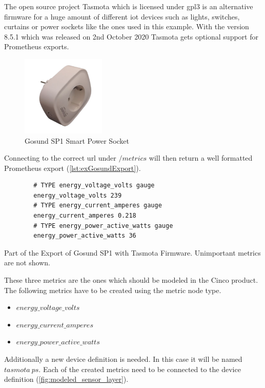 The open source project Tasmota \cite{tasmotawebsite} which is licensed under \gls{gpl3} is an alternative firmware for a huge amount of different \gls{iot} devices such as lights, switches, curtains or power sockets like the ones used in this example.
With the version 8.5.1 which was released on 2nd October 2020 Tasmota gets optional support for Prometheus exports. 

\begin{figure}[!ht]
	\centering
	\includegraphics[width=4cm]{assets/images/gosund.png}
	\caption{Gosund SP1 Smart Power Socket}
	\label{fig:gosund_sp1}
\end{figure}

Connecting to the correct \gls{url} under $/metrics$ will then return a well formatted Prometheus export (\cref{lst:exGosundExport}).

\begin{listing}[!ht]
	\begin{verbatim}
		# TYPE energy_voltage_volts gauge
		energy_voltage_volts 239
		# TYPE energy_current_amperes gauge
		energy_current_amperes 0.218
		# TYPE energy_power_active_watts gauge
		energy_power_active_watts 36
	\end{verbatim}
	\caption{Part of the Export of Gosund SP1 with Tasmota Firmware. Unimportant metrics are not shown.}
	\label{lst:exGosundExport}
\end{listing}

These three metrics are the ones which should be modeled in the Cinco product. The following metrics have to be created using the metric node type. 

\begin{itemize}
	\item $energy\_voltage\_volts$
	\item $energy\_current\_amperes$
	\item $energy\_power\_active\_watts$ 
\end{itemize}

Additionally a new device definition is needed. In this case it will be named $tasmota\ ps$. Each of the created metrics need to be connected to the device definition (\cref{fig:modeled_sensor_layer}).

